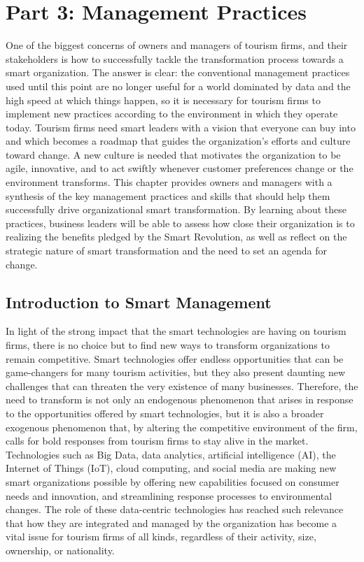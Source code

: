 \documentclass[
  letterpaper,
  DIV=11,
  numbers=noendperiod]{scrreprt}
\begin{document}
\part{Part 3: Management Practices}

One of the biggest concerns of owners and managers of tourism firms, and
their stakeholders is how to successfully tackle the transformation
process towards a smart organization. The answer is clear: the
conventional management practices used until this point are no longer
useful for a world dominated by data and the high speed at which things
happen, so it is necessary for tourism firms to implement new practices
according to the environment in which they operate today. Tourism firms
need smart leaders with a vision that everyone can buy into and which
becomes a roadmap that guides the organization's efforts and culture
toward change. A new culture is needed that motivates the organization
to be agile, innovative, and to act swiftly whenever customer
preferences change or the environment transforms. This chapter provides
owners and managers with a synthesis of the key management practices and
skills that should help them successfully drive organizational smart
transformation. By learning about these practices, business leaders will
be able to assess how close their organization is to realizing the
benefits pledged by the Smart Revolution, as well as reflect on the
strategic nature of smart transformation and the need to set an agenda
for change.

\hypertarget{introduction-to-smart-management}{%
\chapter{Introduction to Smart
Management}\label{introduction-to-smart-management}}

In light of the strong impact that the smart technologies are having on
tourism firms, there is no choice but to find new ways to transform
organizations to remain competitive. Smart technologies offer endless
opportunities that can be game-changers for many tourism activities, but
they also present daunting new challenges that can threaten the very
existence of many businesses. Therefore, the need to transform is not
only an endogenous phenomenon that arises in response to the
opportunities offered by smart technologies, but it is also a broader
exogenous phenomenon that, by altering the competitive environment of
the firm, calls for bold responses from tourism firms to stay alive in
the market. Technologies such as Big Data, data analytics, artificial
intelligence (AI), the Internet of Things (IoT), cloud computing, and
social media are making new smart organizations possible by offering new
capabilities focused on consumer needs and innovation, and streamlining
response processes to environmental changes. The role of these
data-centric technologies has reached such relevance that how they are
integrated and managed by the organization has become a vital issue for
tourism firms of all kinds, regardless of their activity, size,
ownership, or nationality.
\end{document}
